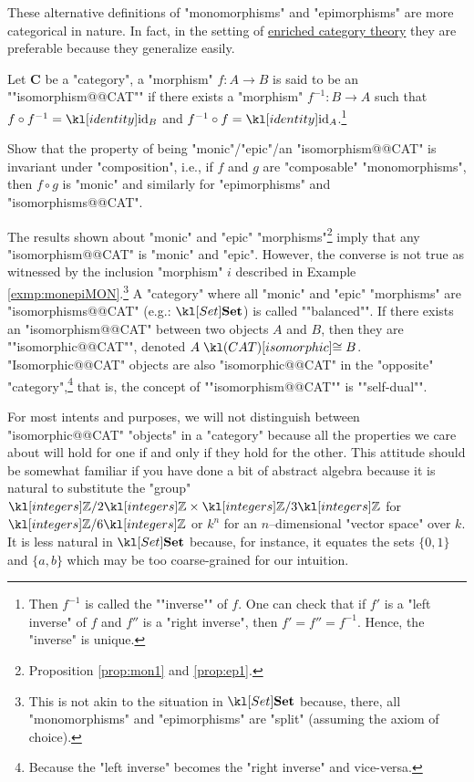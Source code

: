 \documentclass[main.tex]{subfiles}
\begin{document}
\begin{rem}
	These alternative definitions of "monomorphisms" and "epimorphisms" are more categorical in nature. In fact, in the setting of \href{https://ncatlab.org/nlab/show/enriched+category+theory}{enriched category theory} they are preferable because they generalize easily.
\end{rem}
\begin{defn}[Isomorphism]\label{defn:isomorphism}
	\AP Let $\mathbf{C}$ be a "category", a "morphism" $f:A\rightarrow B$ is said to be an ""isomorphism@@CAT"" if there exists a "morphism" $f^{-1}: B\rightarrow A$ such that $f\circ f^{-1} = \id_B$ and $f^{-1}\circ f = \id_A$.\footnote{\AP Then $f^{-1}$ is called the ""inverse"" of $f$. One can check that if $f'$ is a "left inverse" of $f$ and $f''$ is a "right inverse", then $f' = f'' = f^{-1}$. Hence, the "inverse" is unique.}
\end{defn}
\begin{exer}\label{exer:duality:composemor}
	Show that the property of being "monic"/"epic"/an "isomorphism@@CAT" is invariant under "composition", i.e., if $f$ and $g$ are "composable" "monomorphisms", then $f \circ g$ is "monic" and similarly for "epimorphisms" and "isomorphisms@@CAT".
\end{exer}
\begin{rem}
	The results shown about "monic" and "epic" "morphisms"\footnote{Proposition \ref{prop:mon1} and \ref{prop:ep1}.} imply that any "isomorphism@@CAT" is "monic" and "epic". However, the converse is not true as witnessed by the inclusion "morphism" $i$ described in Example \ref{exmp:monepiMON}.\footnote{This is not akin to the situation in $\catSet$ because, there, all "monomorphisms" and "epimorphisms" are "split" (assuming the axiom of choice).} \AP A "category" where all "monic" and "epic" "morphisms" are "isomorphisms@@CAT" (e.g.: $\catSet$) is called ""balanced"". \AP If there exists an "isomorphism@@CAT" between two objects $A$ and $B$, then they are ""isomorphic@@CAT"", denoted $A \isoCAT B$. \AP "Isomorphic@@CAT" objects are also "isomorphic@@CAT" in the "opposite" "category",\footnote{Because the "left inverse" becomes the "right inverse" and vice-versa.} that is, the concept of ""isomorphism@@CAT"" is ""self-dual"".
	
	For most intents and purposes, we will not distinguish between "isomorphic@@CAT" "objects" in a "category" because all the properties we care about will hold for one if and only if they hold for the other. This attitude should be somewhat familiar if you have done a bit of abstract algebra because it is natural to substitute the "group" $\Z/2\Z \times \Z/3\Z$ for $\Z/6\Z$ or $k^n$ for an $n$--dimensional "vector space" over $k$. It is less natural in $\catSet$ because, for instance, it equates the sets $\{0,1\}$ and $\{a,b\}$ which may be too coarse-grained for our intuition.
\end{rem}
\end{document}
